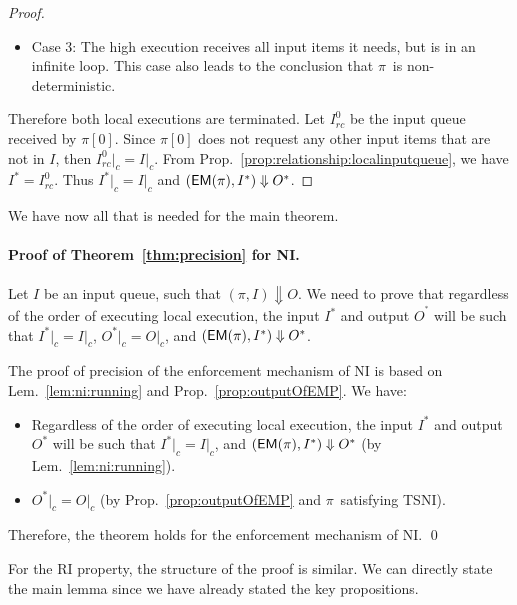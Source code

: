 \documentclass[10pt,a4paper,oneside]{article}
\def\execution#1#2#3{\ensuremath{(#1, #2)\Downarrow#3}}
\def\Irc#1{\ensuremath{I_{rc}^{#1}}}
\def\channeleq#1#2#3{\ensuremath{\restrict{#1}{#3} = \restrict{#2}{#3}}}
\def\restrict#1#2{\ensuremath{{#1}|_{#2}}}
\def\chnl{\ensuremath{c}}
\def\sanserif#1{\ensuremath{\sf #1}}
\def\EM{\ensuremath{{\sanserif{EM}}}}
\def\Prog{\ensuremath{\pi}}
\def\Progl#1{\ensuremath{\Prog[#1]}}
\def\EMP{\ensuremath{\EM(}\ensuremath{\Prog)}}
\begin{document}
\begin{proof}
\begin{itemize}
    \item Case 3: The high execution receives all input items it needs, but is in an infinite loop. This case also leads to the conclusion that \Prog\ is non-deterministic.
\end{itemize}

Therefore both local executions are terminated. Let \Irc{0} be the input queue received by \Progl{0}. Since \Progl{0} does not request any other input items that are not in $I$, then \channeleq{\Irc{0}}{I}{\chnl}. From Prop.~\ref{prop:relationship:localinputqueue}, we have $I^* = \Irc{0}$. Thus \channeleq{I^*}{I}{\chnl} and \execution{\EMP}{I^*}{O^*}.



\end{proof}

We have now all that is needed for the main theorem.

\paragraph{Proof of Theorem~\ref{thm:precision} for NI.}
Let $I$ be an input queue, such that $\execution{\Prog}{I}{O}$. We need to prove that regardless of the order of executing local execution, the input $I^*$ and output $O^^*$ will be such that \channeleq{I^*}{I}{\chnl}, \channeleq{O^*}{O}{\chnl}, and \execution{\EMP}{I^*}{O^*}.



The proof of precision of the enforcement mechanism of NI is based on Lem.~\ref{lem:ni:running} and Prop.~\ref{prop:outputOfEMP}. We have:
\begin{itemize}
\item Regardless of the order of executing local execution, the input $I^*$ and output $O^*$ will be such that \channeleq{I^*}{I}{\chnl}, and \execution{\EMP}{I^*}{O^*} (by Lem.~\ref{lem:ni:running}).
\item \channeleq{O^*}{O}{\chnl} (by Prop.~\ref{prop:outputOfEMP} and \Prog\ satisfying TSNI).
\end{itemize}

Therefore, the theorem holds for the enforcement mechanism of NI. \qed

For the RI property, the structure of the proof is similar. We can directly state the main lemma since we have already stated the key propositions.
\end{document}
